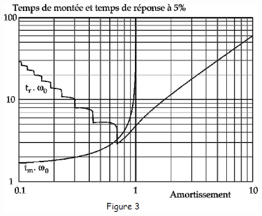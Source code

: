 \documentclass[10pt,fleqn]{article} %
\begin{document}
\begin{multicols}{2}
\begin{center}
\includegraphics[width=\linewidth]{images/image2_5}
\end{center}



%
%
%
%
%
%
%
%
%


\end{multicols}
\end{document}
